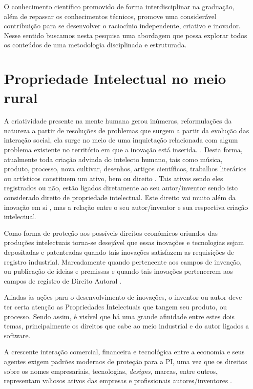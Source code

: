 O conhecimento científico promovido de forma interdisciplinar na graduação, além de repassar os conhecimentos técnicos, promove uma considerável contribuição para se desenvolver o raciocínio independente, criativo e inovador. Nesse sentido buscamos nesta pesquisa uma abordagem que possa explorar todos os conteúdos de uma metodologia disciplinada e estruturada.


\section{Propriedade Intelectual no meio rural}

A criatividade presente na mente humana gerou inúmeras, reformulações da natureza a partir de resoluções de problemas que surgem a partir da evolução das interação social, ela surge no meio de uma inquietação relacionada com algum problema existente no território em que a inovação está inserida. \cite{pacheco_dos_2018}. Desta forma, atualmente toda criação advinda do intelecto humano, tais como música, produto, processo, nova cultivar, desenhos, artigos científicos, trabalhos literários ou artísticos constituem um ativo, bem ou direito \cite{costa_interseccao_2011}. Tais ativos sendo eles registrados ou não, estão ligados diretamente ao seu autor/inventor sendo isto considerado direito de propriedade  intelectual. Este direito vai muito além da inovação em si \cite{wipo_tratado_1970}, mas a relação entre o seu autor/inventor e sua respectiva criação intelectual. 

Como forma de proteção aos possíveis direitos econômicos oriundos das produções intelectuais torna-se desejável que essas inovações e tecnologias sejam depositadas e patenteadas quando tais inovações satisfazem as requisições de registro industrial. Marcadamente quando pertencente aos campos de invenção, ou publicação de ideias e premissas e quando tais inovações pertencerem aos campos de registro de Direito Autoral \cite{wipo_b06_2019}. 

Aliadas  às  ações  para  o  desenvolvimento  de  inovações, o inventor ou autor deve ter certa atenção as Propriedades Intelectuais que tangem seu produto, ou processo. Sendo assim, é visível que há uma grande afinidade entre estes dois temas, principalmente os direitos que cabe ao meio industrial e do autor ligados a software. 

A crescente interação comercial,  financeira  e  tecnológica  entre  a  economia  e  seus agentes  exigem  padrões  modernos  de  proteção  para  a  PI,  uma  vez  que  os  direitos sobre os nomes empresariais, tecnologias, \textit{designs}, marcas, entre outros, representam valiosos ativos das empresas e profissionais autores/inventores \cite{sherwood_propriedade_1992}.  


